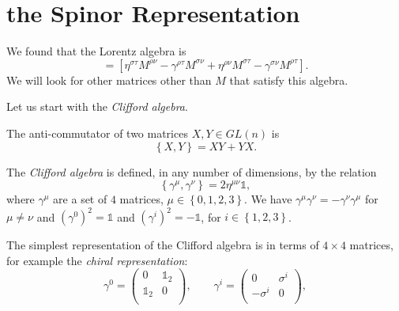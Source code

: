 
\section{the Spinor Representation}%
\label{sec:the_spinor_representation}

We found that the Lorentz algebra is
\begin{equation}
  [M^{\rho\sigma}, M^{\tau\nu}] = [\eta^{\sigma\tau} M^{\rho\nu} - \gamma ^{\rho\tau} M^{\sigma\nu} + \eta ^{\rho\nu} M^{\sigma\tau} - \gamma ^{\sigma\nu} M^{\rho\tau}].
\end{equation}
We will look for other matrices other than $M$ that satisfy this algebra.

Let us start with the \emph{Clifford algebra}.
\begin{definition}[]
  The anti-commutator of two matrices $X, Y \in GL(n)$ is
  \begin{equation}
    \left\{ X, Y \right\} = X Y + Y X.
  \end{equation}
\end{definition}
\begin{definition}[]
  The \emph{Clifford algebra} is defined, in any number of dimensions, by the relation
  \begin{equation}
    \boxed{ \left\{ \gamma^{\mu}, \gamma^{\nu} \right\} = 2 \eta^{\mu\nu} \mathbb{1} },
  \end{equation}
  where $\gamma^{\mu}$ are a set of $4$ matrices, $\mu \in \left\{ 0, 1,2,3 \right\}$.
  We have $\gamma^{\mu} \gamma^{\nu} = - \gamma^{\nu} \gamma^{\mu}$ for $\mu \neq \nu$ and $(\gamma^0)^2 = \mathbb{1}$ and $(\gamma^i)^2 = -\mathbb{1}$, for $i \in \left\{ 1, 2,3 \right\}$.
\end{definition}
The simplest representation of the Clifford algebra is in terms of $4 \times 4$ matrices, for example the \emph{chiral representation}:
\begin{equation}
  \gamma^0 = 
  \begin{pmatrix}
   0 & \mathbb{1}_2 \\
   \mathbb{1}_2 & 0 \\
  \end{pmatrix}, 
  \qquad \gamma^i = 
  \begin{pmatrix}
   0 & \sigma^i \\
   -\sigma^i & 0 \\
  \end{pmatrix},
\end{equation}
